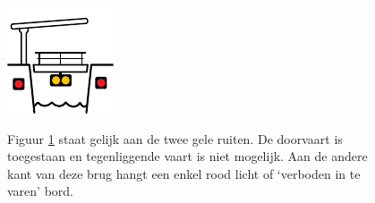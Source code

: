 \begin{figure}[H]
\centering
\begin{minipage}[b]{0.18\textwidth}
	\includegraphics[width=\textwidth]{Hoofdstukken/Bruggen/pdf/brug_doorvaart_geen_tegenligger.pdf}
	\caption{}
	\label{pic:brug:toegestaan_tegenligger}
\end{minipage}
\hfill
\begin{minipage}[t]{0.75\textwidth}
	\vspace{-2.5cm}
	Figuur \ref{pic:brug:toegestaan_tegenligger} staat gelijk aan de twee gele ruiten. De doorvaart is toegestaan en tegenliggende vaart is niet mogelijk. Aan de andere kant van deze brug hangt een enkel rood licht of `verboden in te varen' bord.
\end{minipage}
\end{figure}
\vspace{-0.75cm}

